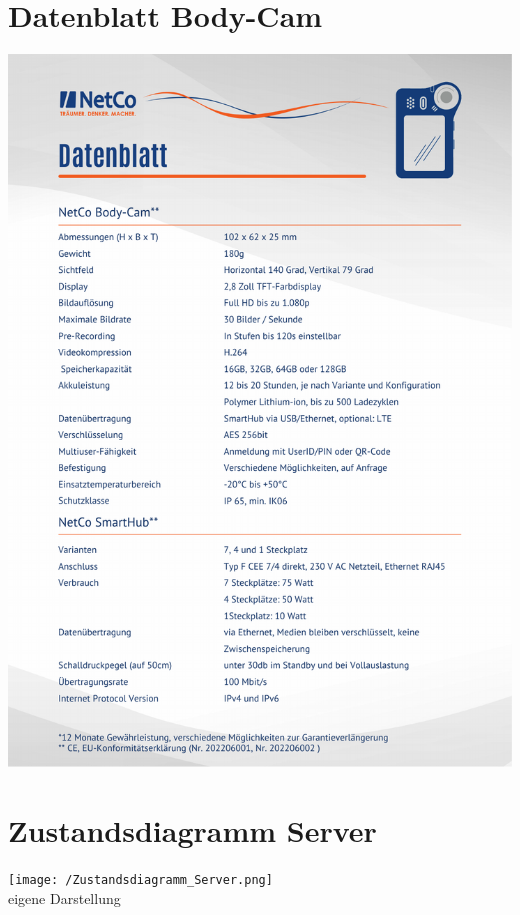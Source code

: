 \documentclass[thesis.tex]{subfiles}
\begin{document}
\section{Datenblatt Body-Cam}\label{anhang:datenblatt}

\includegraphics[page=1,width=\textwidth,height=.88\textheight,keepaspectratio]{../sources/Datenblatt_Bodycam.pdf}\\
\cite{netco}

\section{Zustandsdiagramm Server}\label{anhang:zustandsdiagram_server}

\texttt{[image: /Zustandsdiagramm\_Server.png]}\\
\lbrack eigene Darstellung\rbrack
\end{document}
